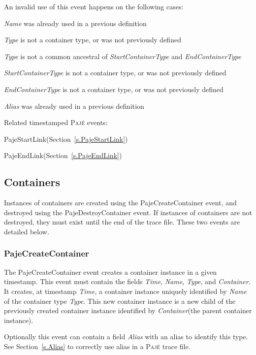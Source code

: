 \documentclass[12pt]{article}
\newcommand{\Paje}{\textsc{Paj\'e}\xspace}
\newcommand{\PajeField}[1]{\emph{#1}\xspace}
\newcommand{\Time}{\PajeField{Time}}
\newcommand{\Name}{\PajeField{Name}}
\newcommand{\Type}{\PajeField{Type}}
\newcommand{\Container}{\PajeField{Container}}
\newcommand{\StartContainerType}{\PajeField{StartContainerType}}
\newcommand{\EndContainerType}{\PajeField{EndContainerType}}
\newcommand{\Alias}{\PajeField{Alias}}
\newcommand{\PajeEvent}[1]{\textsf{#1}\xspace}
\newcommand{\PajeCreateContainer}{\PajeEvent{PajeCreateContainer}}
\newcommand{\PajeDestroyContainer}{\PajeEvent{PajeDestroyContainer}}
\newcommand{\PajeStartLink}{\PajeEvent{PajeStartLink}}
\newcommand{\PajeEndLink}{\PajeEvent{PajeEndLink}}
\newenvironment{itemize*}%
               {\vspace{-1em}
                 \begin{itemize}%
                   \setlength{\itemsep}{0pt}%
                   \setlength{\parskip}{0pt}}%
               {\end{itemize}}
\begin{document}
An invalid use of this event happens on the following cases:
\begin{itemize*}
\item \Name was already used in a previous definition
\item \Type is not a container type, or was not previously defined
\item \Type is not a common ancestral of \StartContainerType and \EndContainerType
\item \StartContainerType is not a container type, or was not previously defined
\item \EndContainerType is not a container type, or was not previously defined
\item \Alias was already used in a previous definition
\end{itemize*}

Related timestamped \Paje events:
\begin{itemize*}
\item \PajeStartLink (Section~\ref{s.PajeStartLink})
\item \PajeEndLink (Section~\ref{s.PajeEndLink})
\end{itemize*}

\subsection{Containers}
Instances of containers are created using the \PajeCreateContainer
event, and destroyed using the \PajeDestroyContainer event. If
instances of containers are not destroyed, they must exist until the
end of the trace file. These two events are detailed below.

\subsubsection{PajeCreateContainer}
\label{s.PajeCreateContainer}
The \PajeCreateContainer event creates a container instance in a given
timestamp. This event must contain the fields \Time, \Name, \Type, and
\Container. It creates, at timestamp \Time, a container instance
uniquely identified by \Name of the container type \Type. This new
container instance is a new child of the previously created container
instance identified by \Container (the parent container instance).

Optionally this event can contain a field \Alias with an alias to
identify this type. See Section~\ref{s.Alias} to correctly use alias
in a \Paje trace file.
\end{document}
